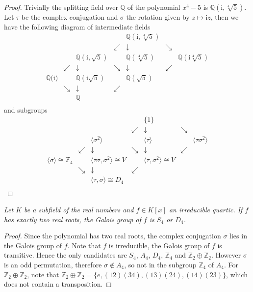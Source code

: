 \begin{proof}
Trivially the splitting field over $\mathbb{Q}$ of the polynomial $x^4-5$ is $\mathbb{Q}(\mathrm{i},\sqrt[4]{5})$. Let $\tau$ be the complex conjugation and $\sigma$ the rotation given by $z\mapsto\mathrm{i}z$, then we have the following diagram of intermediate fields 
$$
\begin{matrix}
	&		&		&		&		\mathbb{Q} (\mathrm{i},\sqrt[4]{5})&		&		\\
	&		&		&		\swarrow&		\downarrow&		\searrow&		\\
	&		&		\mathbb{Q} (\mathrm{i},\sqrt{5})&		&		\mathbb{Q} (\sqrt[4]{5})&		&		\mathbb{Q} (\mathrm{i}\sqrt[4]{5})\\
	&		\swarrow&		\downarrow&		\searrow&		\downarrow&		\swarrow&		\\
	\mathbb{Q} (\mathrm{i)}&		&		\mathbb{Q} (\mathrm{i}\sqrt{5})&		&		\mathbb{Q} (\sqrt{5})&		&		\\
	&		\searrow&		\downarrow&		\swarrow&		&		&		\\
	&		&		\mathbb{Q}&		&		&		&		\\
\end{matrix}
$$
and subgroups 
$$
\begin{matrix}
	&		&		&		&		\{1\}&		&		\\
	&		&		&		\swarrow&		\downarrow&		\searrow&		\\
	&		&		\langle \sigma ^2\rangle&		&		\langle \tau \rangle&		&		\langle \tau \sigma ^2\rangle\\
	&		\swarrow&		\downarrow&		\searrow&		\downarrow&		\swarrow&		\\
	\langle \sigma \rangle \cong \mathbb{Z} _4&		&		\langle \tau \sigma ,\sigma ^2\rangle \cong V&		&		\langle \tau ,\sigma ^2\rangle \cong V&		&		\\
	&		\searrow&		\downarrow&		\swarrow&		&		&		\\
	&		&		\langle \tau ,\sigma \rangle \cong D_4&		&		&		&		\\
\end{matrix}
$$
\end{proof}
\begin{problem}\em
Let $K$ be a subfield of the real numbers and $f\in K[x]$ an irreducible quartic. If $f$ has exactly two real roots, the Galois group of $f$ is $S_4$ or $D_4$.
\end{problem}
\begin{proof}
Since the polynomial has two real roots, the complex conjugation $\sigma$ lies in the Galois group of $f$. Note that $f$ is irreducible, the Galois group of $f$ is transitive. Hence the only candidates are $S_4$, $A_4$, $D_4$, $\mathbb{Z}_4$ and $\mathbb{Z}_2\oplus\mathbb{Z}_2$. However $\sigma$ is an odd permutation, therefore $\sigma\notin A_4$, so not in the subgroup $\mathbb{Z}_4$ of $A_4$. For $\mathbb{Z}_2\oplus\mathbb{Z}_2$, note that $\mathbb{Z}_2\oplus\mathbb{Z}_2=\{e,(12)(34),(13)(24),(14)(23)\}$, which does not contain a transposition.
\end{proof}
